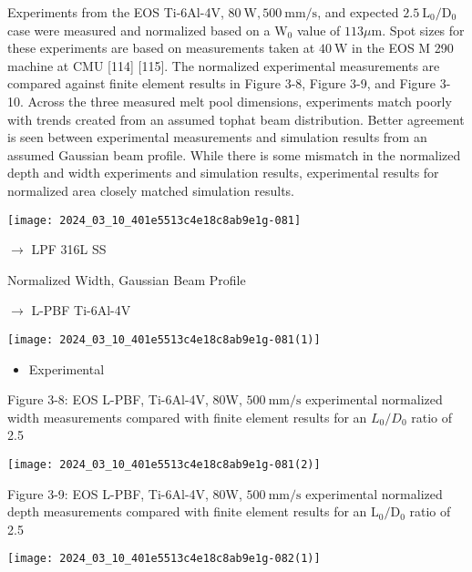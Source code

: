 \documentclass[10pt]{article}
\begin{document}
Experiments from the EOS Ti-6Al-4V, $80 \mathrm{~W}, 500 \mathrm{~mm} / \mathrm{s}$, and expected $2.5 \mathrm{~L}_{0} / \mathrm{D}_{0}$ case were measured and normalized based on a $\mathrm{W}_{0}$ value of $113 \mu \mathrm{m}$. Spot sizes for these experiments are based on measurements taken at $40 \mathrm{~W}$ in the EOS M 290 machine at CMU [114] [115]. The normalized experimental measurements are compared against finite element results in Figure 3-8, Figure 3-9, and Figure 3-10. Across the three measured melt pool dimensions, experiments match poorly with trends created from an assumed tophat beam distribution. Better agreement is seen between experimental measurements and simulation results from an assumed Gaussian beam profile. While there is some mismatch in the normalized depth and width experiments and simulation results, experimental results for normalized area closely matched simulation results.

\begin{center}
\texttt{[image: 2024\_03\_10\_401e5513c4e18c8ab9e1g-081]}
\end{center}

$\longrightarrow$ LPF 316L SS

Normalized Width, Gaussian Beam Profile

$\longrightarrow$ L-PBF Ti-6Al-4V

\begin{center}
\texttt{[image: 2024\_03\_10\_401e5513c4e18c8ab9e1g-081(1)]}
\end{center}

\begin{itemize}
  \item Experimental
\end{itemize}

Figure 3-8: EOS L-PBF, Ti-6Al-4V, 80W, $500 \mathrm{~mm} / \mathrm{s}$ experimental normalized width measurements compared with finite element results for an $L_{0} / D_{0}$ ratio of 2.5

\begin{center}
\texttt{[image: 2024\_03\_10\_401e5513c4e18c8ab9e1g-081(2)]}
\end{center}

Figure 3-9: EOS L-PBF, Ti-6Al-4V, 80W, $500 \mathrm{~mm} / \mathrm{s}$ experimental normalized depth measurements compared with finite element results for an $\mathrm{L}_{0} / \mathrm{D}_{0}$ ratio of 2.5

\begin{center}
\texttt{[image: 2024\_03\_10\_401e5513c4e18c8ab9e1g-082(1)]}
\end{center}
\end{document}
